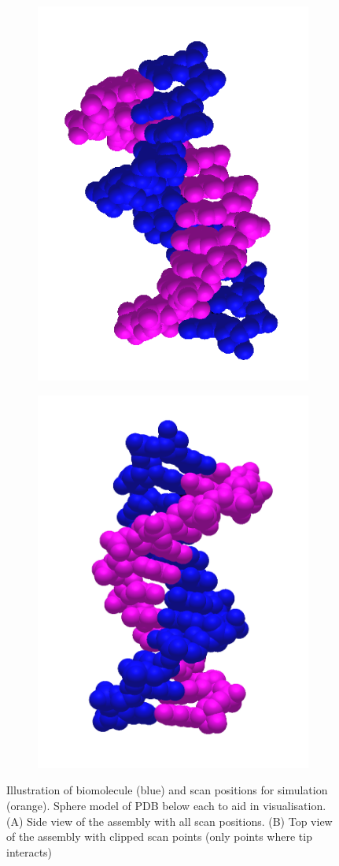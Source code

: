 \begin{figure}[H]
    \hfill
    \vspace{-0.4in}
    
    \begin{subfigure}[t]{0.49\textwidth}
        \centering
        \includegraphics[width=0.35\linewidth, angle=10]{Figures/1BNA_veiw1.png}
    \end{subfigure} 
    \hfill
    \begin{subfigure}[t]{0.49\textwidth}
        \centering
        \includegraphics[width=0.35\linewidth]{Figures/1BNA_veiw2.png}
    \end{subfigure} 
    
    
    
    \caption{\label{fig: 1BNA Scan Position}Illustration of biomolecule (blue) and scan positions for simulation (orange). Sphere model of PDB below each to aid in visualisation. (A) Side view of the assembly with all scan positions. (B) Top view of the assembly with clipped scan points (only points where tip interacts) }
\end{figure}

